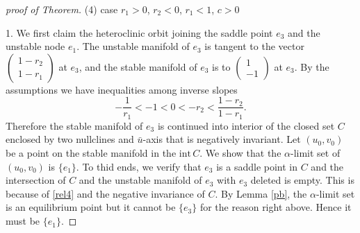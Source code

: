 \documentclass{amsart}
\theoremstyle{definition}
\numberwithin{equation}{section}
\def\ii{{\textrm{int}}\,}
\begin{document}
\begin{proof}[proof of Theorem]
(4) case  $r_1>0$, $r_2<0$, $r_1<1$, $c>0$

1. We first claim the heteroclinic orbit joining the saddle point $e_3$ and the unstable node $e_1$. The unstable manifold of $e_3$ is tangent to the vector $\begin{pmatrix} 1-r_2 \\ 1-r_1 \end{pmatrix}$ at $e_3$, and the stable manifold of $e_3$ is to $\begin{pmatrix} 1 \\ -1 \end{pmatrix}$ at $e_3$. By the assumptions we have inequalities among inverse slopes
\begin{equation}\label{rel4} -\frac{1}{r_1} < -1 < 0< -r_2 < \frac{1-r_2}{1-r_1}. \end{equation}
Therefore the stable manifold of $e_3$ is continued into interior of 
the closed set $C$ enclosed by two nullclines and $\bar u$-axis that is negatively invariant. Let $(u_0,v_0)$ be a point on the stable manifold in the $\ii C$. We show that the $\alpha$-limit set of $(u_0,v_0)$ is $\{e_1\}$. To thid ends, we verify that $e_3$ is a saddle point in $C$ and the intersection of $C$ and the unstable manifold of $e_3$ with $e_3$ deleted is empty. This is because of \eqref{rel4} and the negative invariance of $C$. By Lemma \ref{pb}, the $\alpha$-limit set is an equilibrium point but it cannot be $\{e_3\}$ for the reason right above. Hence it must be $\{e_1\}$.
% 
% 



\end{proof}
\end{document}
